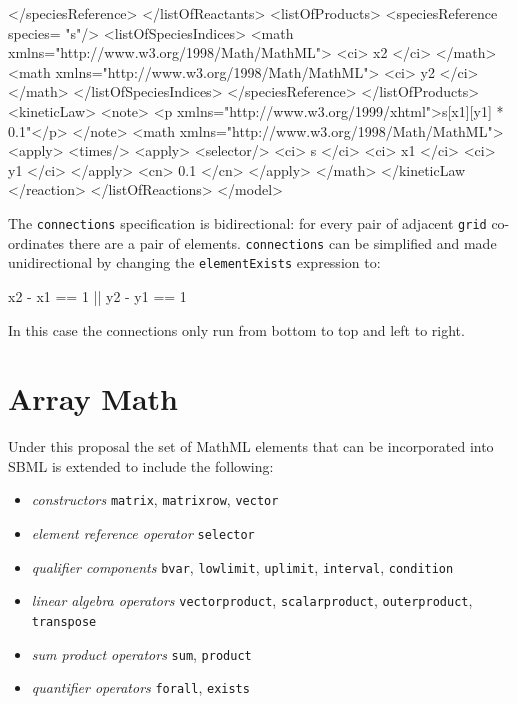 \documentclass{cekarticle}
\begin{document}
\begin{example}
                </speciesReference>
            </listOfReactants>
            <listOfProducts>
                <speciesReference species= "s"/>
                    <listOfSpeciesIndices>
                        <math xmlns="http://www.w3.org/1998/Math/MathML">
                            <ci> x2 </ci>
                        </math>
                        <math xmlns="http://www.w3.org/1998/Math/MathML">
                            <ci> y2 </ci>
                        </math>
                    </listOfSpeciesIndices>
                </speciesReference>
            </listOfProducts>
            <kineticLaw>
                <note>
                    <p xmlns="http://www.w3.org/1999/xhtml">s[x1][y1] * 0.1"</p>
                </note>                
                <math xmlns="http://www.w3.org/1998/Math/MathML">
                    <apply>
                        <times/>
                        <apply>
                            <selector/>
                            <ci> s </ci>
                            <ci> x1 </ci>
                            <ci> y1 </ci>
                        </apply>
                        <cn> 0.1 </cn>                            
                    </apply>
                </math>
            </kineticLaw
        </reaction>
    </listOfReactions>
</model>
\end{example}

The \texttt{connections} specification is bidirectional: for every
pair of adjacent \texttt{grid} co-ordinates there are a pair of
elements. \texttt{connections} can be simplified and made
unidirectional by changing the \texttt{elementExists} expression
to:
\begin{example}
x2 - x1 == 1 || y2 - y1 == 1
\end{example}
In this case the connections only run from bottom to top and left
to right.

\section{Array Math}
\label{sec:math}

Under this proposal the set of MathML elements that can be incorporated into SBML is extended 
to include the following:
\begin{itemize}
\item \emph{constructors} \texttt{matrix}, \texttt{matrixrow}, \texttt{vector}
\item \emph{element reference operator} \texttt{selector}
\item \emph{qualifier components} \texttt{bvar}, \texttt{lowlimit}, \texttt{uplimit}, \texttt{interval}, \texttt{condition}
\item \emph{linear algebra operators} \texttt{vectorproduct}, \texttt{scalarproduct}, \texttt{outerproduct}, \texttt{transpose}
\item \emph{sum product operators} \texttt{sum}, \texttt{product}
\item \emph{quantifier operators} \texttt{forall}, \texttt{exists}
\end{itemize}
\end{document}
